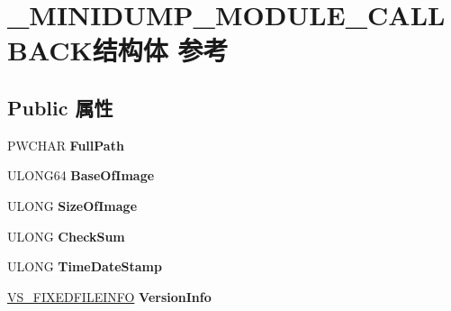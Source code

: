 \hypertarget{struct___m_i_n_i_d_u_m_p___m_o_d_u_l_e___c_a_l_l_b_a_c_k}{}\section{\+\_\+\+M\+I\+N\+I\+D\+U\+M\+P\+\_\+\+M\+O\+D\+U\+L\+E\+\_\+\+C\+A\+L\+L\+B\+A\+C\+K结构体 参考}
\label{struct___m_i_n_i_d_u_m_p___m_o_d_u_l_e___c_a_l_l_b_a_c_k}
\subsection*{Public 属性}
\begin{DoxyCompactItemize}
\item 
\mbox{\label{struct___m_i_n_i_d_u_m_p___m_o_d_u_l_e___c_a_l_l_b_a_c_k_a223dc0578e75299c19866d0f78184dfd}} 
P\+W\+C\+H\+AR {\bfseries Full\+Path}
\item 
\mbox{\label{struct___m_i_n_i_d_u_m_p___m_o_d_u_l_e___c_a_l_l_b_a_c_k_a867b692549fbdf5a84fcd50e0d648ede}} 
U\+L\+O\+N\+G64 {\bfseries Base\+Of\+Image}
\item 
\mbox{\label{struct___m_i_n_i_d_u_m_p___m_o_d_u_l_e___c_a_l_l_b_a_c_k_a80f3735139bab84f6661a4340465539a}} 
U\+L\+O\+NG {\bfseries Size\+Of\+Image}
\item 
\mbox{\label{struct___m_i_n_i_d_u_m_p___m_o_d_u_l_e___c_a_l_l_b_a_c_k_aee2d56f6f4804f51d5eb95f8702d3b95}} 
U\+L\+O\+NG {\bfseries Check\+Sum}
\item 
\mbox{\label{struct___m_i_n_i_d_u_m_p___m_o_d_u_l_e___c_a_l_l_b_a_c_k_ab94beddb2efc1fddea5a5eff3ce6500d}} 
U\+L\+O\+NG {\bfseries Time\+Date\+Stamp}
\item 
\mbox{\label{struct___m_i_n_i_d_u_m_p___m_o_d_u_l_e___c_a_l_l_b_a_c_k_af413e637addb54fe28e9d5feb00af0fd}} 
\hyperlink{structtag_v_s___f_i_x_e_d_f_i_l_e_i_n_f_o}{V\+S\+\_\+\+F\+I\+X\+E\+D\+F\+I\+L\+E\+I\+N\+FO} {\bfseries Version\+Info}

\end{DoxyCompactItemize}
